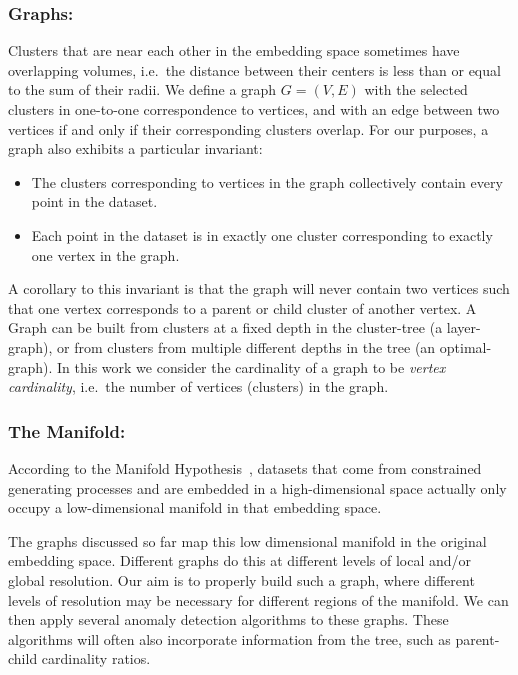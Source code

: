 \subsubsection{Graphs:}
Clusters that are near each other in the embedding space sometimes have overlapping volumes, i.e.\ the distance between their centers is less than or equal to the sum of their radii.
We define a graph $G=(V,E)$ with the selected clusters in one-to-one correspondence to vertices, and with an edge between two vertices if and only if their corresponding clusters overlap.
For our purposes, a graph also exhibits a particular invariant:
\begin{itemize}
    \item The clusters corresponding to vertices in the graph collectively contain every point in the dataset.
    \item Each point in the dataset is in exactly one cluster corresponding to exactly one vertex in the graph.
\end{itemize}
A corollary to this invariant is that the graph will never contain two vertices such that one vertex corresponds to a parent or child cluster of another vertex.
A Graph can be built from clusters at a fixed depth in the cluster-tree (a layer-graph), or from clusters from multiple different depths in the tree (an optimal-graph).
In this work we consider the cardinality of a graph to be \textit{vertex cardinality}, i.e.\ the number of vertices (clusters) in the graph.

\subsubsection{The Manifold:}
According to the Manifold Hypothesis~\cite{fefferman2016testing},
datasets that come from constrained generating processes and are embedded in a high-dimensional space actually only occupy a low-dimensional manifold in that embedding space.

The graphs discussed so far map this low dimensional manifold in the original embedding space.
Different graphs do this at different levels of local and/or global resolution.
Our aim is to properly build such a graph, where different levels of resolution may be necessary for different regions of the manifold.
We can then apply several anomaly detection algorithms to these graphs.
These algorithms will often also incorporate information from the tree, such as parent-child cardinality ratios.

